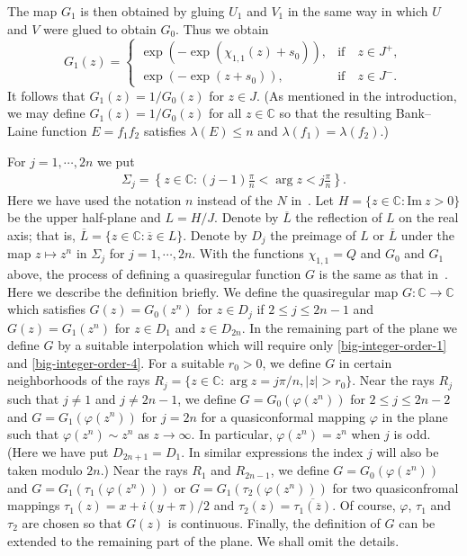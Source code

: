 \documentclass[12pt]{amsart}
\numberwithin{equation}{section}
\begin{document}
The map $G_1$ is then obtained by gluing $U_1$ and $V_1$ in the same way in which $U$ and $V$ were glued to obtain $G_0$. Thus we obtain
\begin{equation}\label{big-integer-order-4}
G_1(z)=
\left\{
  \begin{array}{ll}
    \exp(-\exp(\chi_{1,1}(z)+s_0)),  & \text{if} \quad  z\in J^{+}, \\
    \exp(-\exp(z+s_0)),        & \text{if} \quad  z\in J^{-}.
  \end{array}
\right.
\end{equation}
It follows that $G_1(z)=1/G_0(z)$ for $z\in J$. (As mentioned in the introduction, we may define $G_1(z)=1/G_0(z)$ for all $z\in \mathbb{C}$ so that the resulting Bank--Laine function $E=f_1f_2$ satisfies $\lambda(E)\leq n$ and $\lambda(f_1)=\lambda(f_2)$.)

For $j=1,\cdots,2n$ we put
\begin{equation*}%
\begin{split}
\Sigma_j=\left\{z\in \mathbb{C}: (j-1)\frac{\pi}{n}<\arg z<j\frac{\pi}{n}\right\}.
\end{split}
\end{equation*}
Here we have used the notation $n$ instead of the $N$ in~\cite[Section~5]{Bergweilereremenko2017}. Let $H=\{z\in \mathbb{C}:\text{Im}\ z>0\}$ be the upper half-plane and $L=H/J$. Denote by $\overline{L}$ the reflection of $L$ on the real axis; that is, $\overline{L}=\{z\in \mathbb{C}: \overline{z}\in L\}$. Denote by $D_j$ the preimage of $L$ or $\overline{L}$ under the map $z\mapsto z^n$ in $\Sigma_j$ for $j=1,\cdots,2n$. With the functions $\chi_{1,1}=Q$ and $G_0$ and $G_1$ above, the process of defining a quasiregular function $G$ is the same as that in~\cite[Subsection~5.2-Subsection~5.3]{Bergweilereremenko2017}. Here we describe the definition briefly. We define the quasiregular map $G:\mathbb{C}\to\mathbb{C}$ which satisfies $G(z)=G_0(z^n)$ for $z\in D_j$ if $2\leq j\leq 2n-1$ and $G(z)=G_1(z^n)$ for $z\in D_1$ and $z\in D_{2n}$. In the remaining part of the plane we define $G$ by a suitable interpolation which will require only \eqref{big-integer-order-1} and \eqref{big-integer-order-4}. For a suitable $r_0>0$, we define $G$ in certain neighborhoods of the rays $R_j=\{z\in \mathbb{C}: \arg z=j\pi/n,|z|>r_0\}$. Near the rays $R_j$ such that $j\not=1$ and $j\not=2n-1$, we define $G=G_0(\varphi(z^n))$ for $2\leq j\leq 2n-2$ and $G=G_1(\varphi(z^n))$ for $j=2n$ for a quasiconformal mapping $\varphi$ in the plane such that $\varphi(z^n)\sim z^n$ as $z\to\infty$. In particular, $\varphi(z^n)=z^n$ when $j$ is odd. (Here we have put $D_{2n+1}=D_1$. In similar expressions the index $j$ will also be taken modulo $2n$.)
Near the rays $R_1$ and $R_{2n-1}$, we define $G=G_0(\varphi(z^n))$ and $G=G_1(\tau_1(\varphi(z^n)))$ or $G=G_1(\tau_2(\varphi(z^n)))$ for two quasiconfromal mappings $\tau_1(z)=x+i(y+\pi)/2$ and $\tau_2(z)=\overline{\tau_1(\overline{z})}$. Of course, $\varphi$, $\tau_1$ and $\tau_2$ are chosen so that $G(z)$ is continuous.
Finally, the definition of $G$ can be extended to the remaining part of the plane. We shall omit the details.
\end{document}
